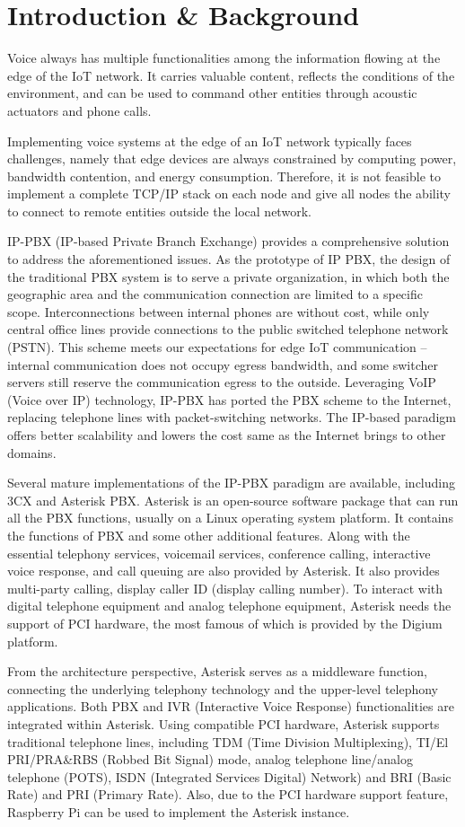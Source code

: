 \section{Introduction \& Background}	\label{sec:introduction-background}
Voice always has multiple functionalities among the information flowing at the edge of the IoT network. It carries valuable content, reflects the conditions of the environment, and can be used to command other entities through acoustic actuators and phone calls.

Implementing voice systems at the edge of an IoT network typically faces challenges, namely that edge devices are always constrained by computing power, bandwidth contention, and energy consumption. Therefore, it is not feasible to implement a complete TCP/IP stack on each node and give all nodes the ability to connect to remote entities outside the local network.

IP-PBX (IP-based Private Branch Exchange) provides a comprehensive solution to address the aforementioned issues. As the prototype of IP PBX, the design of the traditional PBX system is to serve a private organization, in which both the geographic area and the communication connection are limited to a specific scope. Interconnections between internal phones are without cost, while only central office lines provide connections to the public switched telephone network (PSTN). This scheme meets our expectations for edge IoT communication -- internal communication does not occupy egress bandwidth, and some switcher servers still reserve the communication egress to the outside. Leveraging VoIP (Voice over IP) technology, IP-PBX has ported the PBX scheme to the Internet, replacing telephone lines with packet-switching networks. The IP-based paradigm offers better scalability and lowers the cost same as the Internet brings to other domains. 

Several mature implementations of the IP-PBX paradigm are available, including 3CX and Asterisk PBX. Asterisk is an open-source software package that can run all the PBX functions, usually on a Linux operating system platform. It contains the functions of PBX and some other additional features. Along with the essential telephony services, voicemail services, conference calling, interactive voice response, and call queuing are also provided by Asterisk. It also provides multi-party calling, display caller ID (display calling number). To interact with digital telephone equipment and analog telephone equipment, Asterisk needs the support of PCI hardware, the most famous of which is provided by the Digium platform. 

From the architecture perspective, Asterisk serves as a middleware function, connecting the underlying telephony technology and the upper-level telephony applications. Both PBX and IVR (Interactive Voice Response) functionalities are integrated within Asterisk. Using compatible PCI hardware, Asterisk supports traditional telephone lines, including TDM (Time Division Multiplexing), TI/El PRI/PRA\&RBS (Robbed Bit Signal) mode, analog telephone line/analog telephone (POTS), ISDN (Integrated Services Digital) Network) and BRI (Basic Rate) and PRI (Primary Rate). Also, due to the PCI hardware support feature, Raspberry Pi can be used to implement the Asterisk instance.